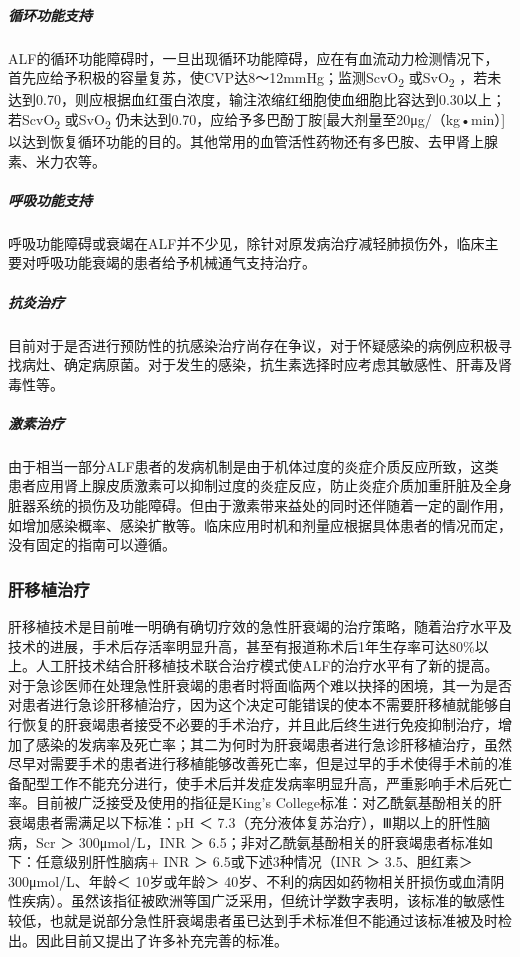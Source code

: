 \subparagraph{循环功能支持}

ALF的循环功能障碍时，一旦出现循环功能障碍，应在有血流动力检测情况下，首先应给予积极的容量复苏，使CVP达8～12mmHg；监测ScvO\textsubscript{2}
或SvO\textsubscript{2}
，若未达到0.70，则应根据血红蛋白浓度，输注浓缩红细胞使血细胞比容达到0.30以上；若ScvO\textsubscript{2}
或SvO\textsubscript{2}
仍未达到0.70，应给予多巴酚丁胺{[}最大剂量至20μg/（kg•min）{]}以达到恢复循环功能的目的。其他常用的血管活性药物还有多巴胺、去甲肾上腺素、米力农等。

\subparagraph{呼吸功能支持}

呼吸功能障碍或衰竭在ALF并不少见，除针对原发病治疗减轻肺损伤外，临床主要对呼吸功能衰竭的患者给予机械通气支持治疗。

\subparagraph{抗炎治疗}

目前对于是否进行预防性的抗感染治疗尚存在争议，对于怀疑感染的病例应积极寻找病灶、确定病原菌。对于发生的感染，抗生素选择时应考虑其敏感性、肝毒及肾毒性等。

\subparagraph{激素治疗}

由于相当一部分ALF患者的发病机制是由于机体过度的炎症介质反应所致，这类患者应用肾上腺皮质激素可以抑制过度的炎症反应，防止炎症介质加重肝脏及全身脏器系统的损伤及功能障碍。但由于激素带来益处的同时还伴随着一定的副作用，如增加感染概率、感染扩散等。临床应用时机和剂量应根据具体患者的情况而定，没有固定的指南可以遵循。

\subsubsection{肝移植治疗}

肝移植技术是目前唯一明确有确切疗效的急性肝衰竭的治疗策略，随着治疗水平及技术的进展，手术后存活率明显升高，甚至有报道称术后1年生存率可达80\%以上。人工肝技术结合肝移植技术联合治疗模式使ALF的治疗水平有了新的提高。对于急诊医师在处理急性肝衰竭的患者时将面临两个难以抉择的困境，其一为是否对患者进行急诊肝移植治疗，因为这个决定可能错误的使本不需要肝移植就能够自行恢复的肝衰竭患者接受不必要的手术治疗，并且此后终生进行免疫抑制治疗，增加了感染的发病率及死亡率；其二为何时为肝衰竭患者进行急诊肝移植治疗，虽然尽早对需要手术的患者进行移植能够改善死亡率，但是过早的手术使得手术前的准备配型工作不能充分进行，使手术后并发症发病率明显升高，严重影响手术后死亡率。目前被广泛接受及使用的指征是King's
College标准：对乙酰氨基酚相关的肝衰竭患者需满足以下标准：pH ＜
7.3（充分液体复苏治疗），Ⅲ期以上的肝性脑病，Scr ＞ 300μmol/L，INR ＞
6.5；非对乙酰氨基酚相关的肝衰竭患者标准如下：任意级别肝性脑病+ INR ＞
6.5或下述3种情况（INR ＞ 3.5、胆红素＞ 300μmol/L、年龄＜ 10岁或年龄＞
40岁、不利的病因如药物相关肝损伤或血清阴性疾病）。虽然该指征被欧洲等国广泛采用，但统计学数字表明，该标准的敏感性较低，也就是说部分急性肝衰竭患者虽已达到手术标准但不能通过该标准被及时检出。因此目前又提出了许多补充完善的标准。

